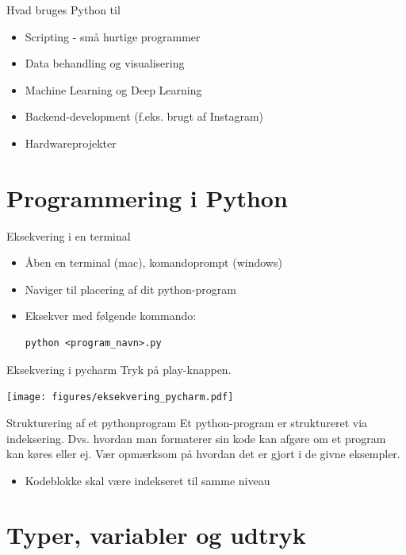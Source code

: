 \documentclass{beamer}
\begin{document}
\begin{frame}{Hvad bruges Python til}
\begin{itemize}
\item Scripting - små hurtige programmer
\item Data behandling og visualisering
\item Machine Learning og Deep Learning
\item Backend-development (f.eks. brugt af Instagram)
\item Hardwareprojekter
\end{itemize}
\end{frame}

\section{Programmering i Python}

\begin{frame}[fragile]{Eksekvering i en terminal}
\begin{itemize}
\item Åben en terminal (mac), komandoprompt (windows)
\item Naviger til placering af dit python-program
\item Eksekver med følgende kommando:
\begin{lstlisting}[style=terminal]
python <program_navn>.py
\end{lstlisting}
\end{itemize}

\end{frame}

\begin{frame}{Eksekvering i pycharm}
Tryk på play-knappen.
\begin{center}
\texttt{[image: figures/eksekvering\_pycharm.pdf]}
\end{center}
\end{frame}


\begin{frame}{Strukturering af et pythonprogram}
Et python-program er struktureret via indeksering. Dvs. hvordan man formaterer sin kode kan afgøre om et program kan køres eller ej. Vær opmærksom på hvordan det er gjort i de givne eksempler.
\begin{itemize}
\item Kodeblokke skal være indekseret til samme niveau
\end{itemize}
\end{frame}

\section{Typer, variabler og udtryk}
\end{document}
